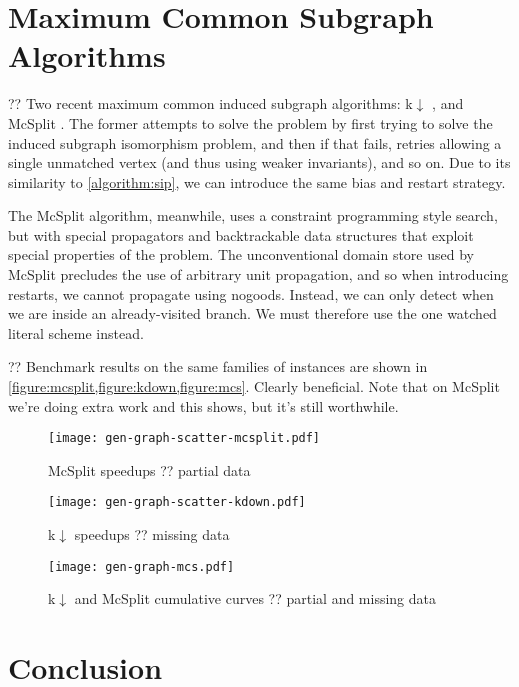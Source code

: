 \documentclass{article}
\newcommand{\citep}[1]{\cite{#1}}
\begin{document}
\section{Maximum Common Subgraph Algorithms}

?? Two recent maximum common induced subgraph algorithms: k${\downarrow}$
\citep{DBLP:conf/aaai/HoffmannMR17}, and McSplit \citep{DBLP:conf/ijcai/McCreeshPT17}. The former
attempts to solve the problem by first trying to solve the induced subgraph isomorphism problem, and
then if that fails, retries allowing a single unmatched vertex (and thus using weaker invariants),
and so on. Due to its similarity to \cref{algorithm:sip}, we can introduce the same bias and restart
strategy.

The McSplit algorithm, meanwhile, uses a constraint programming style search, but with special
propagators and backtrackable data structures that exploit special properties of the problem. The
unconventional domain store used by McSplit precludes the use of arbitrary unit propagation, and so
when introducing restarts, we cannot propagate using nogoods. Instead, we can only detect when we
are inside an already-visited branch. We must therefore use the one watched literal scheme instead.

?? Benchmark results on the same families of instances are shown in
\cref{figure:mcsplit,figure:kdown,figure:mcs}. Clearly beneficial. Note that on McSplit we're doing
extra work and this shows, but it's still worthwhile.

\begin{figure}[p]
    \centering
    \texttt{[image: gen-graph-scatter-mcsplit.pdf]}
    \caption{McSplit speedups ?? partial data}\label{figure:mcsplit}
\end{figure}

\begin{figure}[p]
    \centering
    \texttt{[image: gen-graph-scatter-kdown.pdf]}
    \caption{k${\downarrow}$ speedups ?? missing data}\label{figure:kdown}
\end{figure}

\begin{figure}[p]
    \centering
    \texttt{[image: gen-graph-mcs.pdf]}
    \caption{k${\downarrow}$ and McSplit cumulative curves ?? partial and missing
    data}\label{figure:mcs}
\end{figure}

\section{Conclusion}
\end{document}
